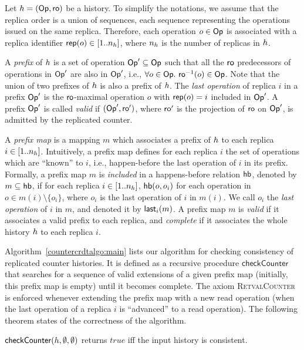 Let ${h} = (\mathsf{Op}, \mathsf{ro})$ be a history.
To simplify the notations, we assume that the replica order is a union of sequences, each sequence representing the operations issued on the same replica.
Therefore, each operation $o\in \mathsf{Op}$ is associated with a replica identifier ${\sf rep}(o)\in [1..n_{h}]$, where $n_{h}$ is the number of replicas in ${h}$.

A \emph{prefix} of ${h}$ is a set of operation $\mathsf{Op}'\subseteq \mathsf{Op}$ such that all the $\mathsf{ro}$ predecessors of operations in $\mathsf{Op}'$ are also in $\mathsf{Op}'$, i.e., $\forall {o}\in \mathsf{Op}.\ \mathsf{ro}^{-1}({o})\in \mathsf{Op}$. Note that the union of two prefixes of ${h}$ is also a prefix of ${h}$. The \emph{last operation} of replica $i$ in a prefix $\mathsf{Op}'$ is the $\mathsf{ro}$-maximal operation $o$ with ${\sf rep}(o)=i$ included in $\mathsf{Op}'$.
A prefix $\mathsf{Op}'$ is called \emph{valid} if $(\mathsf{Op}',\mathsf{ro}')$, where $\mathsf{ro}'$ is the projection of $\mathsf{ro}$ on $\mathsf{Op}'$, is admitted by the replicated counter.

A \emph{prefix map} is a mapping $m$ which associates a prefix of ${h}$ to each replica $i\in [1..n_{h}]$.
Intuitively, a prefix map defines for each replica $i$ the set of operations which are ``known'' to $i$, i.e., happen-before the last operation of $i$ in its prefix. Formally, a prefix map $m$ is \emph{included} in a happens-before relation $\textsf{hb}$, denoted by $m\subseteq \textsf{hb}$, if for each replica $i\in [1..n_{h}]$, $\textsf{hb}(o,o_i)$ for each operation in $o\in m(i)\setminus\{o_i\}$, where $o_i$ is the last operation of $i$ in $m(i)$. We call $o_i$ the \emph{last operation} of $i$ in $m$, and denoted it by ${\sf last}_i(m)$.
A prefix map $m$ is \emph{valid} if it associates a valid prefix to each replica, and \emph{complete} if it associates the whole history ${h}$ to each replica $i$.

Algorithm~\ref{countercrdtalgo:main} lists our algorithm for checking consistency of replicated counter histories. It is defined as a recursive procedure $\mathsf{checkCounter}$ that searches for a sequence of valid extensions of a given prefix map (initially, this prefix map is empty) until it becomes complete. The axiom \textsc{RetvalCounter} is enforced whenever extending the prefix map with a new {\sf read} operation (when the last operation of a replica $i$ is ``advanced'' to a {\sf read} operation). The following theorem states of the correctness of the algorithm.

\vspace{-2mm}
\begin{theorem}

  $\mathsf{checkCounter}({h},\emptyset,\emptyset)$ returns $\mathit{true}$ if{f} the input history is consistent.

\vspace{-2mm}
\end{theorem}

